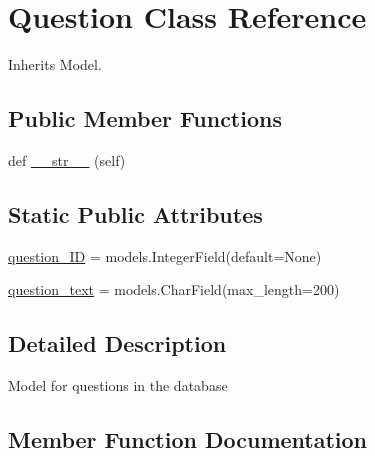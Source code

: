 \hypertarget{classdynamicfilterapp_1_1models_1_1_question}{}\section{Question Class Reference}
\label{classdynamicfilterapp_1_1models_1_1_question}


Inherits Model.

\subsection*{Public Member Functions}
\begin{DoxyCompactItemize}
\item 
def \hyperlink{classdynamicfilterapp_1_1models_1_1_question_a23e8041ce1015febe4fdace3225714f9}{\+\_\+\+\_\+str\+\_\+\+\_\+} (self)
\end{DoxyCompactItemize}
\subsection*{Static Public Attributes}
\begin{DoxyCompactItemize}
\item 
\hyperlink{classdynamicfilterapp_1_1models_1_1_question_a4614954525e0499e3e5ae2de1f277ac8}{question\+\_\+\+ID} = models.\+Integer\+Field(default=None)
\item 
\hyperlink{classdynamicfilterapp_1_1models_1_1_question_a200d22e5ef377c5e3799614d9f9730f8}{question\+\_\+text} = models.\+Char\+Field(max\+\_\+length=200)
\end{DoxyCompactItemize}


\subsection{Detailed Description}
\begin{DoxyVerb}Model for questions in the database
\end{DoxyVerb}
 

\subsection{Member Function Documentation}
\mbox{\label{classdynamicfilterapp_1_1models_1_1_question_a23e8041ce1015febe4fdace3225714f9}} 
